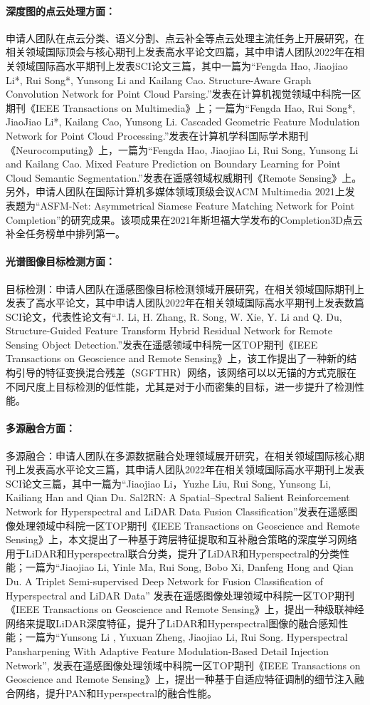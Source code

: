 \documentclass[12pt]{article}
\newcommand{\myPara}[1]{\paragraph{#1：}}
\begin{document}
\myPara{深度图的点云处理方面}申请人团队在点云分类、语义分割、点云补全等点云处理主流任务上开展研究，在相关领域国际顶会与核心期刊上发表高水平论文四篇，其中申请人团队2022年在相关领域国际高水平期刊上发表SCI论文三篇，其中一篇为“Fengda Hao, Jiaojiao Li*, Rui Song*, Yunsong Li and Kailang Cao. Structure-Aware Graph Convolution Network for Point Cloud Parsing.”发表在计算机视觉领域中科院一区期刊《IEEE Transactions on Multimedia》上；一篇为“Fengda Hao, Rui Song*, JiaoJiao Li*, Kailang Cao, Yunsong Li. Cascaded Geometric Feature Modulation Network for Point Cloud Processing.”发表在计算机学科国际学术期刊《Neurocomputing》上，一篇为“Fengda Hao, Jiaojiao Li, Rui Song, Yunsong Li and Kailang Cao. Mixed Feature Prediction on Boundary Learning for Point Cloud Semantic Segmentation.”发表在遥感领域权威期刊《Remote Sensing》上。另外，申请人团队在国际计算机多媒体领域顶级会议ACM Multimedia 2021上发表题为“ASFM-Net: Asymmetrical Siamese Feature Matching Network for Point Completion”的研究成果。该项成果在2021年斯坦福大学发布的Completion3D点云补全任务榜单中排列第一。

\myPara{光谱图像目标检测方面}
目标检测：申请人团队在遥感图像目标检测领域开展研究，在相关领域国际期刊上发表了高水平论文，其中申请人团队2022年在相关领域国际高水平期刊上发表数篇SCI论文，代表性论文有“J. Li, H. Zhang, R. Song, W. Xie, Y. Li and Q. Du, Structure-Guided Feature Transform Hybrid Residual Network for Remote Sensing Object Detection.”发表在遥感领域中科院一区TOP期刊《IEEE Transactions on Geoscience and Remote Sensing》上，该工作提出了一种新的结构引导的特征变换混合残差（SGFTHR）网络，该网络可以以无锚的方式克服在不同尺度上目标检测的低性能，尤其是对于小而密集的目标，进一步提升了检测性能。

\myPara{多源融合方面}
多源融合：申请人团队在多源数据融合处理领域展开研究，在相关领域国际核心期刊上发表高水平论文三篇，其申请人团队2022年在相关领域国际高水平期刊上发表SCI论文三篇，其中一篇为“Jiaojiao Li，Yuzhe Liu, Rui Song, Yunsong Li, Kailiang Han and Qian Du. Sal2RN: A Spatial–Spectral Salient Reinforcement Network for Hyperspectral and LiDAR Data Fusion Classification”发表在遥感图像处理领域中科院一区TOP期刊《IEEE Transactions on Geoscience and Remote Sensing》上，本文提出了一种基于跨层特征提取和互补融合策略的深度学习网络用于LiDAR和Hyperspectral联合分类，提升了LiDAR和Hyperspectral的分类性能；一篇为“Jiaojiao Li, Yinle Ma, Rui Song, Bobo Xi, Danfeng Hong and Qian Du. A Triplet Semi-supervised Deep Network for Fusion Classification of Hyperspectral and LiDAR Data” 发表在遥感图像处理领域中科院一区TOP期刊《IEEE Transactions on Geoscience and Remote Sensing》上，提出一种级联神经网络来提取LiDAR深度特征，提升了LiDAR和Hyperspectral图像的融合感知性能；一篇为“Yunsong Li , Yuxuan Zheng, Jiaojiao Li, Rui Song. Hyperspectral Pansharpening With Adaptive Feature Modulation-Based Detail Injection Network”, 发表在遥感图像处理领域中科院一区TOP期刊《IEEE Transactions on Geoscience and Remote Sensing》上，提出一种基于自适应特征调制的细节注入融合网络，提升PAN和Hyperspectral的融合性能。
\end{document}
